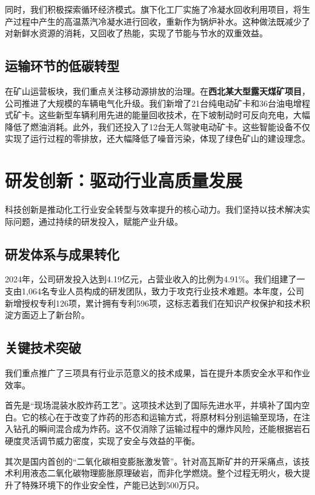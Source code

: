 \documentclass[a4paper,12pt]{article}
\begin{document}
同时，我们积极探索循环经济模式。旗下化工厂实施了冷凝水回收利用项目，将生产过程中产生的高温蒸汽冷凝水进行回收，重新作为锅炉补水。这种做法既减少了对新鲜水资源的消耗，又回收了热能，实现了节能与节水的双重效益。

\subsection{运输环节的低碳转型}

在矿山运营板块，我们重点关注移动源排放的治理。在\textbf{西北某大型露天煤矿项目}，公司推进了大规模的车辆电气化升级。我们新增了21台纯电动矿卡和36台油电增程式矿卡。这些新型车辆利用先进的能量回收技术，在下坡制动时可反向充电，大幅降低了燃油消耗。此外，我们还投入了12台无人驾驶电动矿卡。这些智能设备不仅实现了运行过程的零排放，还大幅降低了噪音污染，体现了绿色矿山的建设理念。

\section{研发创新：驱动行业高质量发展}

科技创新是推动化工行业安全转型与效率提升的核心动力。我们坚持以技术解决实际问题，通过持续的研发投入，赋能产业升级。

\subsection{研发体系与成果转化}

2024年，公司研发投入达到4.19亿元，占营业收入的比例为4.91\%。我们组建了一支由1,064名专业人员构成的研发团队，致力于攻克行业技术难题。本年度，公司新增授权专利126项，累计拥有专利596项，这标志着我们在知识产权保护和技术积淀方面迈上了新台阶。

\subsection{关键技术突破}

我们重点推广了三项具有行业示范意义的技术成果，旨在提升本质安全水平和作业效率。

首先是“现场混装水胶炸药工艺”。这项技术达到了国际先进水平，并填补了国内空白。它的核心在于改变了炸药的形态和运输方式，将原材料分别运输至现场，在注入钻孔的瞬间混合成为炸药。这不仅消除了运输过程中的爆炸风险，还能根据岩石硬度灵活调节威力密度，实现了安全与效益的平衡。

其次是国内首创的“二氧化碳相变膨胀激发管”。针对高瓦斯矿井的开采痛点，该技术利用液态二氧化碳物理膨胀原理破岩，而非化学燃烧。整个过程无明火，极大提升了特殊环境下的作业安全性，产能已达到500万只。
\end{document}
